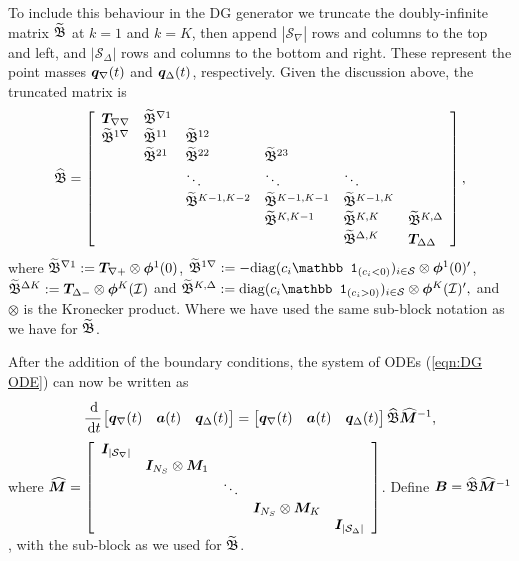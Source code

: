 To include this behaviour in the DG generator we truncate the doubly-infinite matrix \(\widetilde{\mathfrak{\boldsymbol B}}\) at \(k=1\) and \(k=K\), then append \(|\mathcal S_\nabla|\) rows and columns to the top and left, and \(|\mathcal S_\Delta|\) rows and columns to the bottom and right. These represent the point masses \(\boldsymbol q_\nabla(t)\) and \(\boldsymbol q_\Delta(t)\), respectively. Given the discussion above, the truncated matrix is
\[\widehat{\mathfrak{\boldsymbol B}} = \left[\begin{array}{llllll}
	\boldsymbol T_{\nabla\nabla}& \widetilde{\mathfrak{\boldsymbol B}}^{\nabla1} & & & & \\
	\widetilde{\mathfrak{\boldsymbol B}}^{1\nabla} & \widetilde{\mathfrak{\boldsymbol B}}^{11} & \widetilde{\mathfrak{\boldsymbol B}}^{12} & & & \\
	& \widetilde{\mathfrak{\boldsymbol B}}^{21} & \widetilde{\mathfrak{\boldsymbol B}}^{22} & \widetilde{\mathfrak{\boldsymbol B}}^{23} & & \\
	& & \ddots & \ddots & \ddots & \\
	& & \widetilde{\mathfrak{\boldsymbol B}}^{K-1,K-2} &\widetilde{\mathfrak{\boldsymbol B}}^{K-1,K-1} & \widetilde{\mathfrak{\boldsymbol B}}^{K-1,K} & \\
	& & &\widetilde{\mathfrak{\boldsymbol B}}^{K,K-1} & \widetilde{\mathfrak{\boldsymbol B}}^{K,K} & \widetilde{\mathfrak{\boldsymbol B}}^{K,\Delta} \\
	& & & & \widetilde{\mathfrak{\boldsymbol B}}^{\Delta, K} & \boldsymbol T_{\Delta\Delta}
\end{array}\right],\]
where \(\widetilde{\mathfrak{\boldsymbol B}}^{\nabla1} := \boldsymbol T_{\nabla+}\otimes \boldsymbol\phi^1(0)\), \(\widetilde{\mathfrak{\bs B}}^{1\nabla} :=-\diag(c_i\mathbb 1_{(c_i<0)})_{i\in\calS}\otimes \boldsymbol \phi^1(0)\tr{}\), \(\widetilde{\mathfrak{\boldsymbol B}}^{\Delta K} := \boldsymbol T_{\Delta-}\otimes \boldsymbol\phi^K(\mathcal I)\) and \(\widetilde{\mathfrak{\bs B}}^{K,\Delta} := \diag(c_i\mathbb 1_{(c_i>0)})_{i\in\calS} \otimes \boldsymbol \phi^K(\mathcal I)\tr{},\) and \(\otimes\) is the Kronecker product. Where we have used the same sub-block notation as we have for \(\widetilde{\mathfrak{\boldsymbol B}}\).

After the addition of the boundary conditions, the system of ODEs (\ref{eqn:DG ODE}) can now be written as 
\begin{align}\label{eqn: DG ODE w BCs}
	\cfrac{\, \mathrm{d}}{\, \mathrm{d} t} \begin{bmatrix} \boldsymbol q_{\nabla}(t) & {\boldsymbol a}(t) & \boldsymbol q_\Delta(t) \end{bmatrix} 
	= \begin{bmatrix} \boldsymbol q_{\nabla}(t) & {\boldsymbol a}(t) & \boldsymbol q_\Delta(t) \end{bmatrix} \widehat{\mathfrak{\boldsymbol B}}\widehat{\boldsymbol M}^{-1},
\end{align}
where \(\widehat{\boldsymbol M} = \left[\begin{array}{ccccc}
		\boldsymbol I_{|\mathcal{S}_\nabla|} & & & & \\
		& \boldsymbol I_{N_S}\otimes \boldsymbol M_1 & & & \\
		& & \ddots & & \\
		& & & \boldsymbol I_{N_S}\otimes \boldsymbol M_K & \\
		& & & & \boldsymbol I_{|\mathcal{S}_\Delta|}
	\end{array}\right]\).
Define \( \boldsymbol B = \widehat{\mathfrak{\boldsymbol B}}\widehat{\boldsymbol M}^{-1}\), with the sub-block as we used for \(\widetilde{\mathfrak{\boldsymbol B}}\).

